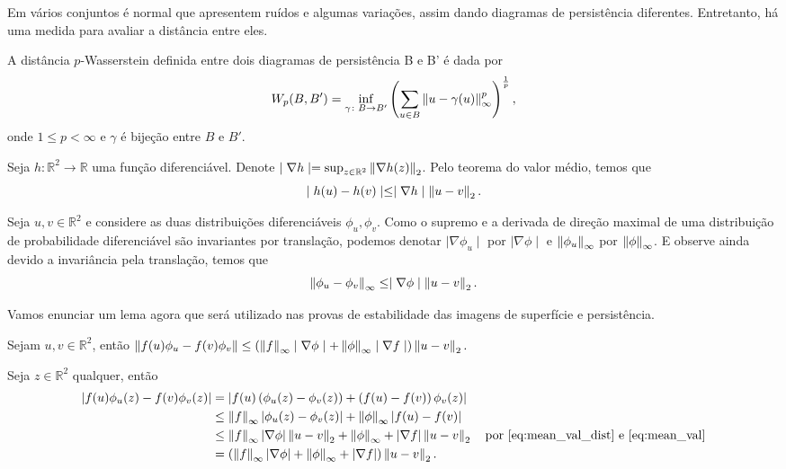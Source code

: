 Em vários conjuntos é normal que apresentem ruídos e algumas variações, assim dando diagramas de persistência
diferentes. Entretanto, há uma medida para avaliar a distância entre eles. 
\begin{defi}
    A distância $p$-Wasserstein definida entre dois diagramas de persistência B e B' é dada por 
    \begin{equation*}
        W_p(B,B') = \inf_{\gamma\colon B \to B'} \left( \sum_{u\in B} \left\lVert u - \gamma(u)\right\rVert_{\infty}^{p} 
                    \right)^\frac{1}{p},
    \end{equation*}
    onde $1 \leq p < \infty$ e $\gamma$ é bijeção entre $B$ e $B'$. 
\end{defi}

Seja $h\colon \mathbb{R}^2 \to \mathbb{R}$ uma função diferenciável. Denote 
$\mid \nabla h \mid = \sup_{z\in \mathbb{R}^2} \left\lVert\nabla h(z)\right\rVert_2$. Pelo teorema do valor médio, temos que 
\begin{equation}\label{eq:mean_val}
    \mid h(u) - h(v) \mid \leq \mid \nabla h \mid \left\lVert u-v\right\rVert_2.
\end{equation}

Seja $u,v\in \mathbb{R}^2$ e considere as duas distribuições diferenciáveis $\phi_u, \phi_v$. Como o supremo e 
a derivada de direção maximal de uma distribuição de probabilidade diferenciável são invariantes por translação,
podemos denotar $\mid \nabla \phi_u \mid$ por $\mid \nabla \phi \mid$ e $\left\lVert\phi_u\right\rVert_\infty$ por
$\left\lVert\phi\right\rVert_\infty$. E observe ainda devido a invariância pela translação, temos que 
\begin{equation}\label{eq:mean_val_dist}
    \left\lVert\phi_u - \phi_v\right\rVert_\infty \leq \mid \nabla \phi \mid \left\lVert u-v\right\rVert_2.
\end{equation} 

Vamos enunciar um lema agora que será utilizado nas provas de estabilidade das imagens de superfície e persistência.

\begin{lem}\label{lema:persimg}
    Sejam $u,v\in \mathbb{R}^2$, então $\left\lVert f(u)\phi_u - f(v)\phi_v\right\rVert \leq 
    \left( \left\lVert f\right\rVert_\infty \mid \nabla \phi \mid + \left\lVert\phi\right\rVert_\infty \mid \nabla f \mid \right) \left\lVert u-v\right\rVert_2.$
\end{lem}
\begin{demonstracao}
Seja $z\in \mathbb{R}^2$ qualquer, então
\begin{align*}
  \begin{split}
    \left\lvert f(u)\phi_u(z) - f(v)\phi_v(z)\right\rvert &= \left\lvert f(u) \left(\phi_u(z) - \phi_v(z)\right) + \left( f(u) - f(v)\right)
    \phi_v(z)\right\rvert \\
    &\leq \left\lVert f\right\rVert_\infty \left\lvert\phi_u(z) - \phi_v(z)\right\rvert + \left\lVert\phi\right\rVert_\infty \left\lvert f(u) - f(v)\right\rvert\\
    &\leq \left\lVert f\right\rVert_\infty \left\lvert\nabla \phi\right\rvert \left\lVert u-v\right\rVert_2 + \left\lVert\phi\right\rVert_\infty + \left\lvert\nabla f\right\rvert \left\lVert u-v\right\rVert_2 
     \quad \text{por \ref{eq:mean_val_dist} e \ref{eq:mean_val}}\\
    &= \left( \left\lVert f\right\rVert_\infty \left\lvert\nabla \phi\right\rvert + \left\lVert\phi\right\rVert_\infty + \left\lvert\nabla f\right\rvert\right) \left\lVert u-v\right\rVert_2.
  \end{split}
\end{align*}
\end{demonstracao}

